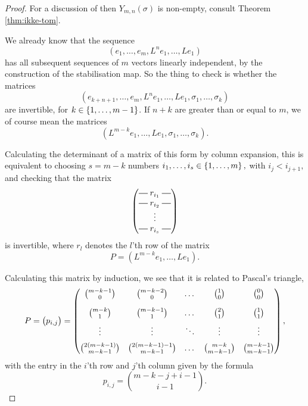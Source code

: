 \begin{proof}
  For a discussion of then $Y_{m,n}(\sigma)$ is non-empty, consult
  Theorem \ref{thm:ikke-tom}.
  
  We already know that the sequence
  \[ \left(e_1,\dots,e_m,L^n e_1,\dots, Le_1 \right) \]
  has all subsequent sequences of $m$ vectors linearly independent,
  by the construction of the stabilisation map. So the thing to check
  is whether the matrices
  \[ \left(e_{k+n+1}, \dots, e_m,L^n e_1, \dots, Le_1, \sigma_1, \dots,
    \sigma_{k}\right) \]
  are invertible, for $k \in \left\{ 1,\dots,m-1 \right\}$. If $n+k$ are greater
  than or equal to $m$, we of course mean the matrices
  \[ \left( L^{m-k}e_1,\dots,L e_1,\sigma_1,\dots,\sigma_k \right). \]
  
  Calculating the determinant of a matrix of this form by column
  expansion, this is equivalent to choosing $s=m-k$ numbers
  $i_1,\dots,i_s \in \left\{ 1,\dots,m \right\},$ with $i_j < i_{j+1},$ and checking that the matrix
  \[
  \begin{pmatrix}
    \matrow{r_{i_1}} \\
    \matrow{r_{i_2}} \\
    & \hspace{-0.75em} \vdots & \\
    \matrow{r_{i_s}}
  \end{pmatrix}
  \]
  is invertible, where $r_{l}$ denotes the $l$'th row of the
  matrix
  \[ P = (L^{m-k}e_1,\dots,Le_1). \]
  
  Calculating this matrix by induction, we see that it is related to
  Pascal's triangle,
  \[ P =
  \begin{pmatrix}
    p_{i,j}
  \end{pmatrix}
  =
  \begin{pmatrix}
    {m-k-1 \choose 0}\vspace{1em} & {m-k-2\choose 0} & \dots &
    {1\choose 0} & {0 \choose 0} \\
    {m-k \choose 1} \vspace{0.5em} & {m-k-1 \choose 1} & \dots & {2
      \choose 1} & {1 \choose 1} \\
    \vdots \vspace{0.5em} & \vdots & \ddots & \vdots & \vdots\\
    {2(m-k-1) \choose {m-k-1}} & {2(m-k-1)-1 \choose m-k-1} & \dots &
    {m-k \choose m-k-1} & {m-k-1 \choose m-k-1}
  \end{pmatrix}, \]
  with the entry in the $i$'th row and $j$'th column given by the
  formula
  \[ p_{i,j} = { m-k-j+i-1 \choose i-1}. \] 
  

\end{proof}
